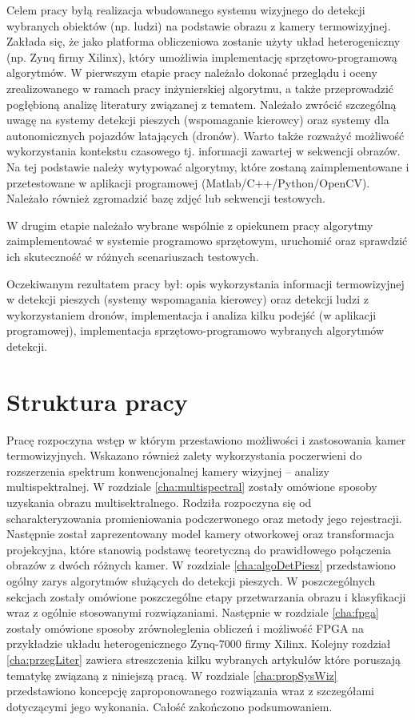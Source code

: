 Celem pracy byłą realizacja wbudowanego systemu wizyjnego do detekcji wybranych obiektów (np. ludzi) na podstawie obrazu z kamery termowizyjnej. Zakłada się, że jako platforma obliczeniowa zostanie użyty układ heterogeniczny (np. Zynq firmy Xilinx), który umożliwia implementację sprzętowo-programową algorytmów.
W pierwszym etapie pracy należało dokonać przeglądu i oceny zrealizowanego w ramach pracy inżynierskiej algorytmu, a także przeprowadzić pogłębioną analizę literatury związanej z tematem. Należało zwrócić szczególną uwagę na systemy detekcji pieszych (wspomaganie kierowcy) oraz systemy dla autonomicznych pojazdów latających (dronów). Warto także rozważyć możliwość wykorzystania kontekstu czasowego tj. informacji zawartej w sekwencji obrazów. Na tej podstawie należy wytypować algorytmy, które zostaną zaimplementowane i przetestowane w aplikacji programowej (Matlab/C++/Python/OpenCV). Należało również zgromadzić bazę zdjęć lub sekwencji testowych.

W drugim etapie należało wybrane wspólnie z opiekunem pracy algorytmy zaimplementować w systemie programowo sprzętowym, uruchomić oraz sprawdzić ich skuteczność w różnych scenariuszach testowych.

Oczekiwanym rezultatem pracy był: opis wykorzystania informacji termowizyjnej w detekcji pieszych (systemy wspomagania kierowcy) oraz detekcji ludzi z wykorzystaniem dronów, implementacja i analiza kilku podejść (w aplikacji programowej), implementacja sprzętowo-programowo wybranych algorytmów detekcji.

\section{Struktura pracy}

Pracę rozpoczyna wstęp w którym przestawiono możliwości i zastosowania kamer termowizyjnych. Wskazano również zalety wykorzystania poczerwieni do rozszerzenia spektrum konwencjonalnej kamery wizyjnej – analizy multispektralnej. 
W rozdziale \ref{cha:multispectral} zostały omówione sposoby uzyskania obrazu multisektralnego. Rodziła rozpoczyna się od scharakteryzowania promieniowania podczerwonego oraz metody jego rejestracji. Następnie został zaprezentowany model kamery otworkowej oraz transformacja projekcyjna, które stanowią podstawę teoretyczną do prawidłowego połączenia obrazów z dwóch różnych kamer. 
W rozdziale \ref{cha:algoDetPiesz} przedstawiono ogólny zarys algorytmów służących do detekcji pieszych. W poszczególnych sekcjach zostały omówione poszczególne etapy przetwarzania obrazu i klasyfikacji wraz z ogólnie stosowanymi rozwiązaniami.
Następnie w rozdziale \ref{cha:fpga} zostały omówione sposoby zrównoleglenia obliczeń i możliwość FPGA na przykładzie układu heterogenicznego Zynq-7000 firmy Xilinx.
Kolejny rozdział \ref{cha:przegLiter} zawiera streszczenia kilku wybranych artykułów które poruszają tematykę związaną z niniejszą pracą.
W rozdziale \ref{cha:propSysWiz} przedstawiono koncepcję zaproponowanego rozwiązania wraz z szczegółami dotyczącymi jego wykonania.
Całość zakończono podsumowaniem.


